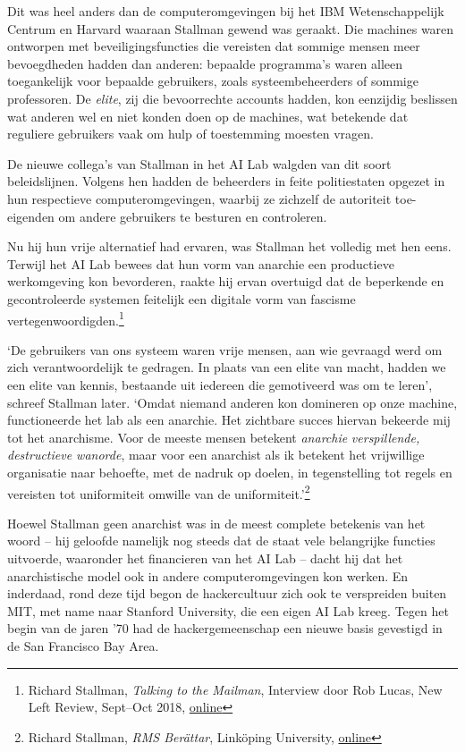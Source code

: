 \documentclass[
  a5paper,
  smalldemyvopaper,11pt,twoside,onecolumn,openright,extrafontsizes,
hidelinks]{memoir}
\begin{document}
Dit was heel anders dan de computeromgevingen bij het IBM
Wetenschappelijk Centrum en Harvard waaraan Stallman gewend was geraakt.
Die machines waren ontworpen met beveiligingsfuncties die vereisten dat
sommige mensen meer bevoegdheden hadden dan anderen: bepaalde
programma's waren alleen toegankelijk voor bepaalde gebruikers, zoals
systeembeheerders of sommige professoren. De \emph{elite}, zij die
bevoorrechte accounts hadden, kon eenzijdig beslissen wat anderen wel en
niet konden doen op de machines, wat betekende dat reguliere gebruikers
vaak om hulp of toestemming moesten vragen.

De nieuwe collega's van Stallman in het AI Lab walgden van dit soort
beleidslijnen. Volgens hen hadden de beheerders in feite politiestaten
opgezet in hun respectieve computeromgevingen, waarbij ze zichzelf de
autoriteit toe-eigenden om andere gebruikers te besturen en controleren.

Nu hij hun vrije alternatief had ervaren, was Stallman het volledig met
hen eens. Terwijl het AI Lab bewees dat hun vorm van anarchie een
productieve werkomgeving kon bevorderen, raakte hij ervan overtuigd dat
de beperkende en gecontroleerde systemen feitelijk een digitale vorm van
fascisme vertegenwoordigden.\footnote{\hspace{0pt}Richard Stallman,
  \emph{Talking to the Mailman}, Interview door Rob Lucas, New Left
  Review, Sept--Oct 2018,
  \href{https://newleftreview.org/issues/ii113/articles/richard-stallman-talking-to-the-mailman}{online}}

`De gebruikers van ons systeem waren vrije mensen, aan wie gevraagd werd
om zich verantwoordelijk te gedragen. In plaats van een elite van macht,
hadden we een elite van kennis, bestaande uit iedereen die gemotiveerd
was om te leren', schreef Stallman later. `Omdat niemand anderen kon
domineren op onze machine, functioneerde het lab als een anarchie. Het
zichtbare succes hiervan bekeerde mij tot het anarchisme. Voor de meeste
mensen betekent \emph{anarchie} \emph{verspillende, destructieve
wanorde}, maar voor een anarchist als ik betekent het vrijwillige
organisatie naar behoefte, met de nadruk op doelen, in tegenstelling tot
regels en vereisten tot uniformiteit omwille van de
uniformiteit.'\footnote{\hspace{0pt}Richard Stallman, \emph{RMS
  Berättar}, Linköping University,
  \href{http://www.lysator.liu.se/history/garb/txt/87-2-rms.txt.}{online}}

Hoewel Stallman geen anarchist was in de meest complete betekenis van
het woord -- hij geloofde namelijk nog steeds dat de staat vele
belangrijke functies uitvoerde, waaronder het financieren van het AI Lab
-- dacht hij dat het anarchistische model ook in andere
computeromgevingen kon werken. En inderdaad, rond deze tijd begon de
hackercultuur zich ook te verspreiden buiten MIT, met name naar Stanford
University, die een eigen AI Lab kreeg. Tegen het begin van de jaren '70
had de hackergemeenschap een nieuwe basis gevestigd in de San Francisco
Bay Area.
\end{document}
